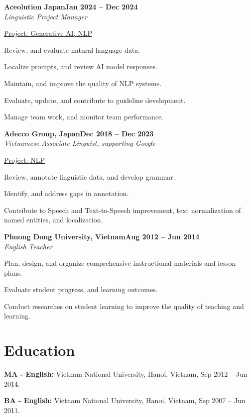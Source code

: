 \documentclass[letterpaper,10pt]{article}
\newcommand{\heading}[2]{
  \hspace{10pt}#1\hfill#2\\
}
\newcommand{\headingBf}[2]{
  \heading{\textbf{#1}}{\textbf{#2}}
}
\newcommand{\headingIt}[2]{
  \heading{\textit{#1}}{\textit{#2}}
}
\newenvironment{resume_list}{
  \vspace{-7pt}
  \begin{itemize}[itemsep=-2px, parsep=1pt, leftmargin=30pt]
}{
  \end{itemize}
}
\newcommand{\itemTitle}[1]{
  \item[] \underline{#1}\vspace{4pt}
}
\begin{document}
  \headingBf{Aceolution Japan}{Jan 2024 -- Dec 2024}
  \headingIt{Linguistic Project Manager}{}
  \begin{resume_list}

  \itemTitle{Project: Generative AI, NLP}
        \item {Review, and evaluate natural language data.}
        \item {Localize prompts, and review AI model responses.}
        \item {Maintain, and improve the quality of NLP systems.}
        \item {Evaluate, update, and contribute to guideline development.}
        \item {Manage team work, and monitor team performance.}
  \end{resume_list}

  \headingBf{Adecco Group, Japan}{Dec 2018 -- Dec 2023}
  \headingIt{Vietnamese Associate Linguist, supporting Google}{}
  \begin{resume_list}
   
    \itemTitle{Project: NLP}
    \item {Review, annotate linguistic data, and develop grammar.} 
        \item {Identify, and address gaps in annotation.}
        \item {Contribute to Speech and Text-to-Speech improvement, text normalization of named entities, and localization.}
  \end{resume_list}

  \headingBf{Phuong Dong University, Vietnam}{Aug 2012 -- Jun 2014}
  \headingIt{English Teacher}{}
  \begin{resume_list}
   
    \item {Plan, design, and organize comprehensive instructional materials and lesson plans.} 
        \item {Evaluate student progress, and learning outcomes.}
        \item {Conduct researches on student learning to improve the quality of teaching and learning.}
  \end{resume_list}

  \section{Education}
 \begin{resume_list}
 \item {\textbf{MA - English:} }{Vietnam National University, Hanoi, Vietnam, Sep 2012 --  Jun 2014.}\\
 \item {\textbf{BA - English:} }{Vietnam National University, Hanoi, Vietnam, Sep 2007 --  Jun 2011.}  
\end{resume_list}


 
\end{document}
